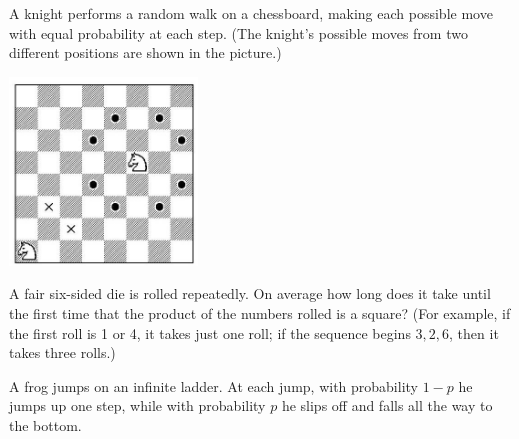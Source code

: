 \documentclass[answers]{exam}
\begin{document}
\begin{questions}
\question%
A knight performs a random walk on a chessboard, making each possible move with equal probability at each step. (The knight's possible moves from two different positions are shown in the picture.)
\begin{center}\includegraphics[width=5cm]{sheet 4 q 3}\end{center}



\question%
A fair six-sided die is rolled repeatedly. On average how long does it take until the first time that the product of the numbers rolled is a square? (For example, if the first roll is 1 or 4, it takes just one roll; if the sequence begins $3,2,6$, then it takes three rolls.)



\question%
A frog jumps on an infinite ladder. At each jump, with probability $1-p$ he jumps up one step, while with probability $p$ he slips off and falls all the way to the bottom.
\end{questions}
\end{document}
